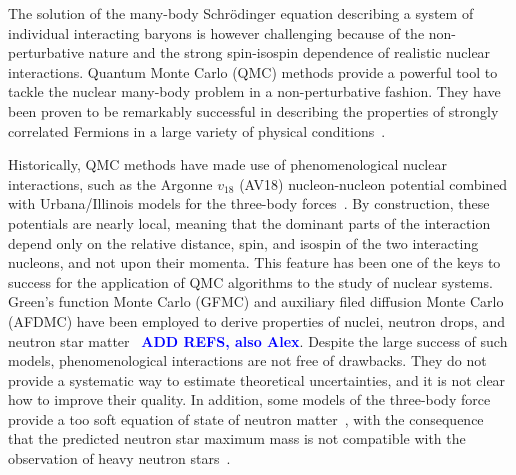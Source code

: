 \documentclass[aps,prc,twocolumn,superscriptaddress,showpacs,floatfix,nofootinbib]{revtex4-1}
\newcommand{\blue}[1]{\protect\textcolor{blue}{#1}}
\begin{document}
The solution of the many-body Schr\"odinger equation describing a system of individual 
interacting baryons is however challenging because of the non-perturbative 
nature and the strong spin-isospin dependence of realistic nuclear interactions. 
Quantum Monte Carlo (QMC) methods provide a powerful tool to tackle the nuclear 
many-body problem in a non-perturbative fashion. They have been proven to be 
remarkably successful in describing the properties of strongly correlated 
Fermions in a large variety of physical conditions~\cite{Carlson:2015}. 

Historically, QMC methods have made use of phenomenological nuclear interactions, 
such as the Argonne $v_{18}$ (AV18) nucleon-nucleon potential combined
with Urbana/Illinois models for the three-body forces~\cite{Carlson:2015}.
By construction, these potentials are nearly local, meaning that the dominant parts 
of the interaction depend only on the relative distance, spin, and isospin of the
two interacting nucleons, and not upon their momenta.
This feature has been one of the keys to success
for the application of QMC algorithms to the study of nuclear systems. Green's function
Monte Carlo (GFMC) and auxiliary filed diffusion Monte Carlo (AFDMC) have been employed 
to derive properties of nuclei, neutron drops, and neutron star matter~\cite{Carlson:2015} \blue{\bf ADD REFS, also Alex}. 
Despite the large success of such models, phenomenological interactions are not free of
drawbacks. They do not provide a systematic way to estimate theoretical uncertainties, 
and it is not clear how to improve their quality. In addition, some models of the 
three-body force provide a too soft equation of state of neutron matter~\cite{Sarsa:2003,Maris:2013},
with the consequence that the predicted neutron star maximum mass is not compatible
with the observation of heavy neutron stars~\cite{Demorest:2010,Antoniadis:2013}.
\end{document}
